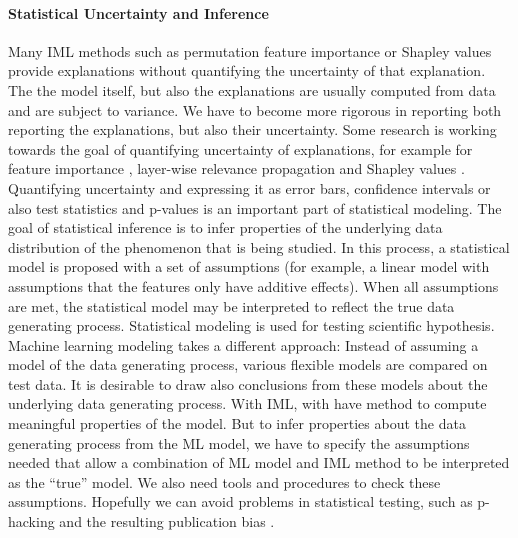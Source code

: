 \documentclass[runningheads]{llncs}
\begin{document}
\paragraph{Statistical Uncertainty and Inference}
Many IML methods such as permutation feature importance or Shapley values provide explanations without quantifying the uncertainty of that explanation.
The the model itself, but also the explanations are usually computed from data and are subject to variance.
We have to become more rigorous in reporting both reporting the explanations, but also their uncertainty.
Some research is working towards the goal of quantifying uncertainty of explanations, for example for feature importance \cite{watson2019testing,fisher2019all}, layer-wise relevance propagation \cite{fabi2020feature} and Shapley values \cite{williamson2020efficient}.
Quantifying uncertainty and expressing it as error bars, confidence intervals or also test statistics and p-values is an important part of statistical modeling.
The goal of statistical inference is to infer properties of the underlying data distribution of the phenomenon that is being studied.
In this process, a statistical model is proposed with a set of assumptions (for example, a linear model with assumptions that the features only have additive effects).
When all assumptions are met, the statistical model may be interpreted to reflect the true data generating process.
Statistical modeling is used for testing scientific hypothesis.
Machine learning modeling takes a different approach:
Instead of assuming a model of the data generating process, various flexible models are compared on test data.
It is desirable to draw also conclusions from these models about the underlying data generating process.
With IML, with have method to compute meaningful properties of the model. 
But to infer properties about the data generating process from the ML model, we have to specify the assumptions needed that allow a combination of ML model and IML method to be interpreted as the \enquote{true} model.
We also need tools and procedures to check these assumptions.
Hopefully we can avoid problems in statistical testing, such as p-hacking \cite{head2015extent} and the resulting publication bias \cite{begg1994publication}.
\end{document}
